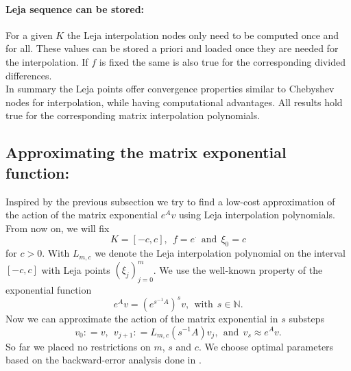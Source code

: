 \documentclass{scrartcl}
\newcommand{\defneq}{\mathrel{\mathop:}=}
\begin{document}
	\paragraph{Leja sequence can be stored:}
	For a given $K$ the Leja interpolation nodes only need to be computed once and for all. These values can be stored a priori and loaded once they are needed for the interpolation. If $f$ is fixed the same is also true for the corresponding divided differences. \\
	
	In summary the Leja points offer convergence properties similar to Chebyshev nodes for interpolation, while having computational advantages. All results hold true for the corresponding matrix interpolation polynomials.
	
	\subsection{Approximating the matrix exponential function:}
	Inspired by the previous subsection we try to find a low-cost approximation of the action of the matrix exponential $e^Av$ using Leja interpolation polynomials. From now on, we will fix 
	\[K=[-c,c], ~~ f = e^\cdot  ~~\text{and}~~ \xi_0 = c \]
	for $c>0$. With $L_{m,c}$ we denote the Leja interpolation polynomial on the interval $[-c,c]$ with Leja points $(\xi_j)_{j=0}^{m}$. We use the well-known property of the exponential function
	\[e^Av = (e^{s^{-1}A})^sv, ~~\text{with}~~ s\in\mathbb{N}.\]
	Now we can approximate the action of the matrix exponential in $s$ substeps
	\[v_0\defneq v, ~~ v_{j+1}\defneq L_{m,c}(s^{-1}A)v_j, ~~\text{and}~~ v_s \approx e^Av.\]
	So far we placed no restrictions on $m$, $s$ and $c$. We choose optimal parameters based on the backward-error analysis done in \cite{lejarev}.
	
\end{document}
